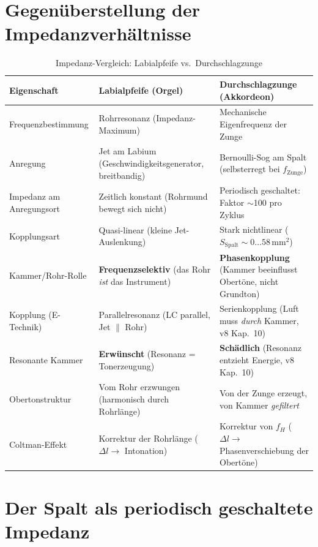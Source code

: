 \documentclass[11pt,a4paper]{article}
\begin{document}
\section{Gegenüberstellung der Impedanzverhältnisse}

\begin{table}[H]
\centering\small
\begin{tabularx}{\textwidth}{l X X}
\toprule
\textbf{Eigenschaft} & \textbf{Labialpfeife (Orgel)} & \textbf{Durchschlagzunge (Akkordeon)} \\
\midrule
Frequenzbestimmung & Rohrresonanz (Impedanz-Maximum) & Mechanische Eigenfrequenz der Zunge \\[3pt]
Anregung & Jet am Labium (Geschwindigkeitsgenerator, breitbandig) & Bernoulli-Sog am Spalt (selbsterregt bei $f_\text{Zunge}$) \\[3pt]
Impedanz am Anregungsort & Zeitlich konstant (Rohrmund bewegt sich nicht) & Periodisch geschaltet: Faktor $\sim$100 pro Zyklus \\[3pt]
Kopplungsart & Quasi-linear (kleine Jet-Auslenkung) & Stark nichtlinear ($S_\text{Spalt} \sim 0 \ldots 58$\,mm$^2$) \\[3pt]
Kammer/Rohr-Rolle & \textbf{Frequenzselektiv} (das Rohr \textit{ist} das Instrument) & \textbf{Phasenkopplung} (Kammer beeinflusst Obertöne, nicht Grundton) \\[3pt]
Kopplung (E-Technik) & Parallelresonanz (LC parallel, Jet $\parallel$ Rohr) & Serienkopplung (Luft muss \textit{durch} Kammer, v8 Kap.~10) \\[3pt]
Resonante Kammer & \textbf{Erwünscht} (Resonanz = Tonerzeugung) & \textbf{Schädlich} (Resonanz entzieht Energie, v8 Kap.~10) \\[3pt]
Obertonstruktur & Vom Rohr erzwungen (harmonisch durch Rohrlänge) & Von der Zunge erzeugt, von Kammer \textit{gefiltert} \\[3pt]
Coltman-Effekt & Korrektur der Rohrlänge ($\Delta l \to$ Intonation) & Korrektur von $f_H$ ($\Delta l \to$ Phasenverschiebung der Obertöne) \\
\bottomrule
\end{tabularx}
\caption{Impedanz-Vergleich: Labialpfeife vs.\ Durchschlagzunge}
\end{table}

\section{Der Spalt als periodisch geschaltete Impedanz}
\end{document}
